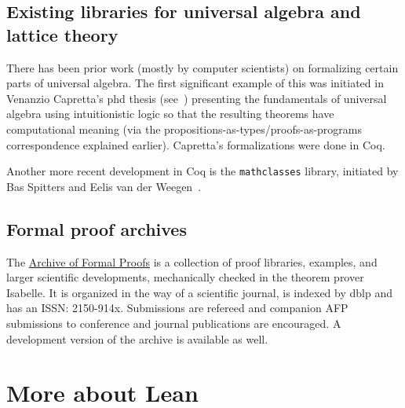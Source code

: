 \documentclass[11pt]{amsart}  %
\begin{document}
\subsection{Existing libraries for universal algebra and lattice theory}
There has been prior work (mostly by computer scientists) on formalizing certain
parts of universal algebra. The first significant example of this was initiated in Venanzio Capretta's phd thesis (see~\cite{capretta:1999})
presenting the fundamentals of universal algebra using intuitionistic logic
so that the resulting theorems have computational meaning (via the propositions-as-types/proofs-as-programs
correspondence explained earlier).  Capretta's formalizations were done in Coq.

Another more recent development in Coq is the {\tt mathclasses} library, initiated by Bas Spitters and Eelis van der Weegen~\cite{MR2678760}. 


\subsection{Formal proof archives}
The \href{https://www.isa-afp.org/}{Archive of Formal Proofs} is a collection of proof libraries, examples, and larger scientific developments, mechanically checked in the theorem prover Isabelle. It is organized in the way of a scientific journal, is indexed by dblp and has an ISSN: 2150-914x.
Submissions are refereed and companion AFP submissions to conference and journal publications are encouraged. A development version of the archive is available as well.








\newpage
\section{More about Lean}
\end{document}
